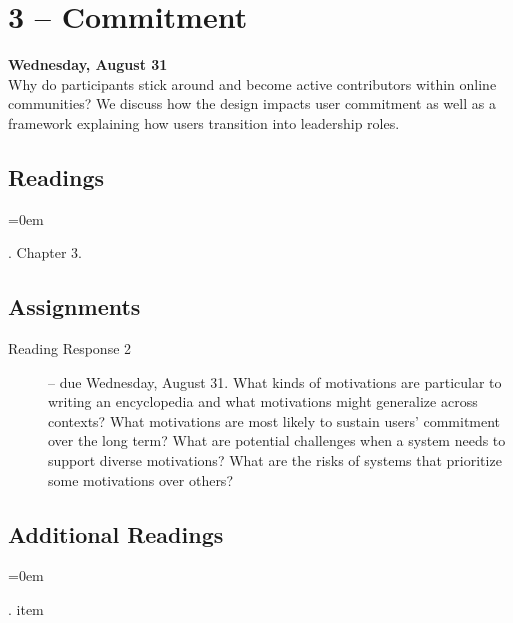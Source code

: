 \documentclass[10pt]{memoir}
\newenvironment{readinglist}{
\begin{list}{}{\leftmargin=8pt \itemindent=0em}
  \setlength{\itemsep}{8pt}
  \setlength{\parskip}{0em}
  \setlength{\parsep}{1em}
  \setlength{\parindent}{8em}}
{\end{list}}
\begin{document}
\section{3 -- Commitment}
\textcolor{CUGold}{\textbf{Wednesday, August 31}}\\
Why do participants stick around and become active contributors within online communities? We discuss how the design impacts user commitment as well as a framework explaining how users transition into leadership roles.

    \subsection{Readings}
    \begin{readinglist}
        \item {}
        \item {}. Chapter 3.
        \item {}
    \end{readinglist}
    
    \subsection{Assignments}
    \begin{description}%
        \item[Reading Response 2 ] -- due Wednesday, August 31. What kinds of motivations are particular to writing an encyclopedia and what motivations might generalize across contexts? What motivations are most likely to sustain users' commitment over the long term? What are potential challenges when a system needs to support diverse motivations? What are the risks of systems that prioritize some motivations over others?
    \end{description}
    
    \subsection{Additional Readings}
    \begin{readinglist}
        \item {}.
        item \bibentry{}
    \end{readinglist}

\end{document}
